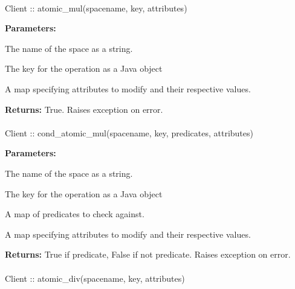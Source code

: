 \paragraph{}
\label{api:java:atomic_mul}
\begin{javacode}
Client :: atomic_mul(spacename, key, attributes)
\end{javacode}
\funcdesc 

\noindent\textbf{Parameters:}
\begin{description}[labelindent=\widthof{{\code{attributes}}},leftmargin=*,noitemsep,nolistsep,align=right]
\item[\code{spacename}] The name of the space as a string.
\item[\code{key}] The key for the operation as a Java object
\item[\code{attributes}] A map specifying attributes to modify and their respective values.
\end{description}

\noindent\textbf{Returns:}
True.  Raises exception on error.

\paragraph{}
\label{api:java:cond_atomic_mul}
\begin{javacode}
Client :: cond_atomic_mul(spacename, key, predicates, attributes)
\end{javacode}
\funcdesc 

\noindent\textbf{Parameters:}
\begin{description}[labelindent=\widthof{{\code{predicates}}},leftmargin=*,noitemsep,nolistsep,align=right]
\item[\code{spacename}] The name of the space as a string.
\item[\code{key}] The key for the operation as a Java object
\item[\code{predicates}] A map of predicates to check against.
\item[\code{attributes}] A map specifying attributes to modify and their respective values.
\end{description}

\noindent\textbf{Returns:}
True if predicate, False if not predicate.  Raises exception on error.

\paragraph{}
\label{api:java:atomic_div}
\begin{javacode}
Client :: atomic_div(spacename, key, attributes)
\end{javacode}
\funcdesc 

